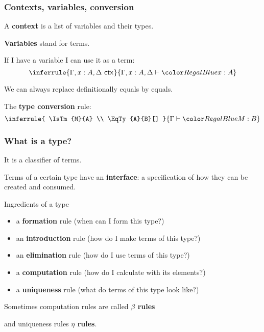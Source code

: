 \documentclass[handout]{beamer} %
\begin{document}
\begin{frame}
  \frametitle{Contexts, variables, conversion}
  A \textbf{context} is a list of variables and their types.
  
  \medskip

  \textbf{Variables} stand for terms.

  If I have a variable I can use it as a term:
  \[
    \inferrule{
      \IsCtx{\Gamma, x : A, \Delta}
    }{
      \IsTm[\Gamma, x : A, \Delta]{x}{A}
    }
  \]
  
  \medskip
  
  We can always replace definitionally equals by equals. 

  The \textbf{type conversion} rule:
  \[
    \inferrule{
      \IsTm{M}{A} \\
      \EqTy{A}{B}[]
    }{
      \IsTm{M}{B}
    }
  \]

\end{frame}

\begin{frame}
  \frametitle{What is a type?}
  
  It is a classifier of terms.

  \medskip
  
  Terms of a certain type have an \textbf{interface}: a specification of how
  they can be created and consumed.
  
  \medskip
  
  \begin{block}{Ingredients of a type}
    \begin{itemize}
      \item a \textbf{formation} rule (when can I form this type?)
      \item an \textbf{introduction} rule (how do I make terms of this type?)
      \item an \textbf{elimination} rule (how do I use terms of this type?)
      \item a \textbf{computation} rule (how do I calculate with its elements?)
      \item a \textbf{uniqueness} rule (what do terms of this type look like?)
    \end{itemize}
  \end{block}
  Sometimes computation rules are called \textbf{$\beta$ rules}
  
  and uniqueness rules \textbf{$\eta$ rules}.
\end{frame}
\end{document}
